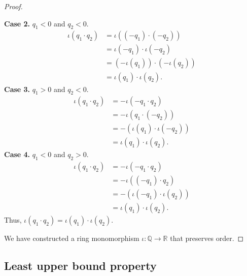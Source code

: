 \begin{proof}
\begin{itemize}
\begin{itemize}
                        \textbf{Case 2.} $q_{1} < 0$ and $q_{2} < 0$.
                        \begin{align*}
                            \iota(q_{1}\cdot q_{2}) & = \iota((-q_{1})\cdot (-q_{2}))        \\
                                                    & = \iota(-q_{1})\cdot\iota(-q_{2})      \\
                                                    & = (-\iota(q_{1}))\cdot (-\iota(q_{2})) \\
                                                    & = \iota(q_{1})\cdot\iota(q_{2}).
                        \end{align*}
                        \textbf{Case 3.} $q_{1} > 0$ and $q_{2} < 0$.
                        \begin{align*}
                            \iota(q_{1}\cdot q_{2}) & = -\iota(-q_{1}\cdot q_{2})         \\
                                                    & = -\iota(q_{1}\cdot (-q_{2}))       \\
                                                    & = -(\iota(q_{1})\cdot\iota(-q_{2})) \\
                                                    & = \iota(q_{1})\cdot\iota(q_{2}).
                        \end{align*}
                        \textbf{Case 4.} $q_{1} < 0$ and $q_{2} > 0$.
                        \begin{align*}
                            \iota(q_{1}\cdot q_{2}) & = -\iota(-q_{1}\cdot q_{2})         \\
                                                    & = -\iota((-q_{1})\cdot q_{2})       \\
                                                    & = -(\iota(-q_{1})\cdot\iota(q_{2})) \\
                                                    & = \iota(q_{1})\cdot\iota(q_{2}).
                        \end{align*}
                        Thus, $\iota(q_{1}\cdot q_{2}) = \iota(q_{1})\cdot\iota(q_{2})$.
              \end{itemize}
    \end{itemize}

    We have constructed a ring monomorphism $\iota:\mathbb{Q}\to\mathbb{R}$ that preserves order.
\end{proof}

\subsection{Least upper bound property}

